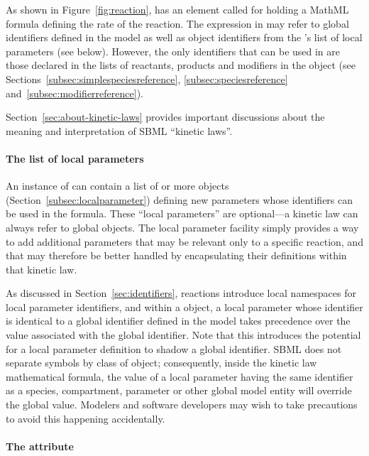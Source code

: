 As shown in Figure~\vref{fig:reaction}, \KineticLaw has an element
called  for holding a MathML formula defining the rate
of the reaction.  The expression in  may refer to
global identifiers defined in the model as well as \LocalParameter object
identifiers from the \KineticLaw's list of local parameters (see
below).  However, the only \Species identifiers that can be used
in  are those declared in the lists of reactants,
products and modifiers in the \Reaction object (see
Sections~\ref{subsec:simplespeciesreference},
\ref{subsec:speciesreference} and~\ref{subsec:modifierreference}).

Section~\ref{sec:about-kinetic-laws} provides important
discussions about the meaning and interpretation of SBML ``kinetic
laws''.


\paragraph{The list of local parameters}

An instance of \KineticLaw can contain a list of  or more
\LocalParameter objects (Section~\ref{subsec:localparameter})
defining new parameters whose identifiers can be used in the
 formula.  These ``local parameters'' are optional---a
kinetic law can always refer to global \Parameter objects.  The
local parameter facility simply provides a way to add additional
parameters that may be relevant only to a specific reaction, and
that may therefore be better handled by encapsulating their
definitions within that kinetic law.

As discussed in Section~\ref{sec:identifiers}, reactions introduce
local namespaces for local parameter identifiers, and within a
\KineticLaw object, a local parameter whose identifier is
identical to a global identifier defined in the model takes
precedence over the value associated with the global identifier.
Note that this introduces the potential for a local parameter
definition to shadow a global identifier.  SBML does not separate
symbols by class of object; consequently, inside the kinetic law
mathematical formula, the value of a local parameter having the
same identifier as a species, compartment, parameter or other
global model entity will override the global value.  Modelers and
software developers may wish to take precautions to avoid this
happening accidentally.


\paragraph{The  attribute}

